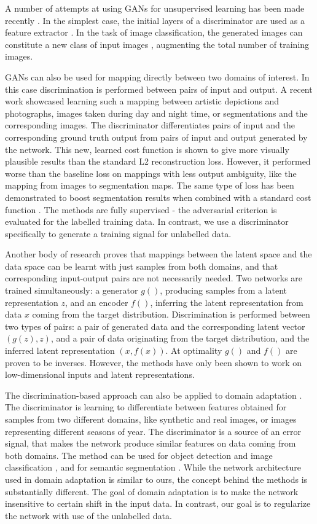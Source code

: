 \documentclass[a4paper]{article}
\begin{document}
A number of attempts at using GANs for unsupervised learning has been made recently \cite{Salimans2016,Radford2015}. In the simplest case, the initial layers of a discriminator are used as a feature extractor \cite{Radford2015}. In the task of image classification, the generated images can constitute a new class of input images \cite{Salimans2016}, augmenting the total number of training images.

GANs can also be used for mapping directly between two domains of interest. In this case discrimination is performed between pairs of input and output. A recent work \cite{pix2pix2016} showcased learning such a mapping between artistic depictions and photographs, images taken during day and night time, or segmentations and the corresponding images. The discriminator differentiates pairs of input and the corresponding ground truth output from pairs of input and output generated by the network. This new, learned cost function is shown to give more visually plausible results than the standard L2 reconstruction loss. However, it performed worse than the baseline loss on mappings with less output ambiguity, like the mapping from images to segmentation maps. The same type of loss has been demonstrated to boost segmentation results when combined with a standard cost function \cite{Luc2016}. The methods are fully supervised - the adversarial criterion is evaluated for the labelled training data. In contrast, we use a discriminator specifically to generate a training signal for unlabelled data.

Another body of research \cite{Donahue2016,ali} proves that mappings between the latent space and the data space can be learnt with just samples from both domains, and that corresponding input-output pairs are not necessarily needed. Two networks are trained simultaneously: a generator $g()$, producing samples from a latent representation $z$, and an encoder $f()$, inferring the latent representation from data $x$ coming from the target distribution. Discrimination is performed between two types of pairs: a pair of generated data and the corresponding latent vector $(g(z),z)$, and a pair of data originating from the target distribution, and the inferred latent representation $(x,f(x))$. At optimality $g()$ and $f()$ are proven to be inverses. However, the methods have only been shown to work on low-dimensional inputs and latent representations. 

The discrimination-based approach can also be applied to domain adaptation \cite{Ganin2015,hoffman2016}. The discriminator is learning to differentiate between features obtained for samples from two different domains, like synthetic and real images, or images representing different seasons of year. The discriminator is a source of an error signal, that makes the network produce similar features on data coming from both domains. 
The method can be used for object detection and image classification \cite{Ganin2015}, and for semantic segmentation \cite{hoffman2016}.
While the network architecture used in domain adaptation is similar to ours, the concept behind the methods is substantially different. The goal of domain adaptation is  to make the network insensitive to certain shift in the input data. In contrast, our goal is to regularize the network with use of the unlabelled data.
\end{document}
